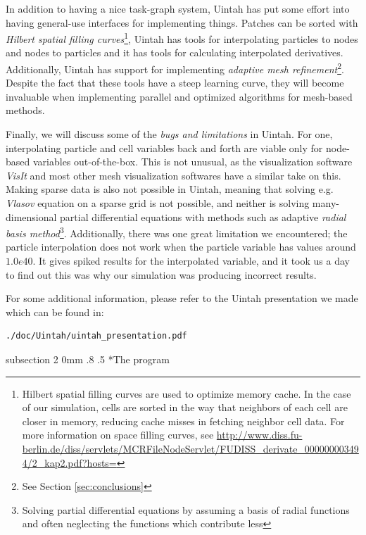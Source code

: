 \documentclass[notitlepage, 12pt]{article}
\makeatletter
\renewcommand{\subsection}{\@startsection    %
        {subsection}
        {2}
        {0mm}
        {.8\baselineskip}
        {.5\baselineskip}
        {\bfseries\normalsize}}
\makeatother
\begin{document}
In addition to having a nice task-graph system, Uintah has put some effort into having general-use interfaces for implementing things. Patches can be sorted 
with \emph{Hilbert spatial filling curves}\footnote{Hilbert spatial filling curves are used to optimize memory cache. In the case of our simulation, cells 
are sorted in the way that neighbors of each cell are closer in memory, reducing cache misses in fetching neighbor cell data. For more information on 
space filling curves, see \url{http://www.diss.fu-berlin.de/diss/servlets/MCRFileNodeServlet/FUDISS_derivate_000000003494/2_kap2.pdf?hosts=}}, Uintah has tools for interpolating particles to nodes and nodes to particles and it has tools for calculating 
interpolated derivatives. Additionally, Uintah has support for implementing \emph{adaptive mesh refinement}\footnote{See Section \ref{sec:conclusions}}. 
Despite the fact that these tools have a steep learning curve, they will become invaluable when implementing parallel and optimized algorithms for 
mesh-based methods.

Finally, we will discuss some of the \emph{bugs and limitations} in Uintah. For one, interpolating particle and cell variables back and forth are viable only 
for node-based variables out-of-the-box. This is not unusual, as the visualization software \emph{VisIt} and most other mesh visualization softwares have 
a similar take on this. Making sparse data is also not possible in Uintah, meaning that solving e.g. \emph{Vlasov} equation on a sparse grid is not 
possible, and neither is solving many-dimensional partial differential equations with methods such as adaptive \emph{radial basis method}\footnote{Solving 
partial differential equations by assuming a basis of radial functions and often neglecting the functions which contribute less}. Additionally, there 
was one great limitation we encountered; the particle interpolation does not work when the particle variable has values around $1.0e40$. It gives spiked 
results for the interpolated variable, and it took us a day to find out this was why our simulation was producing incorrect results.

For some additional information, please refer to the Uintah presentation we 
made which can be found in:

\begin{verbatim}
./doc/Uintah/uintah_presentation.pdf
\end{verbatim}


\subsection*{The program}
\end{document}
